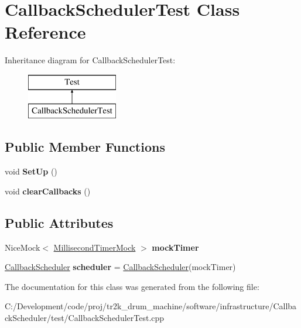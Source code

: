 \hypertarget{class_callback_scheduler_test}{}\section{Callback\+Scheduler\+Test Class Reference}
\label{class_callback_scheduler_test}
Inheritance diagram for Callback\+Scheduler\+Test\+:\begin{figure}[H]
\begin{center}
\leavevmode
\includegraphics[height=2.000000cm]{class_callback_scheduler_test}
\end{center}
\end{figure}
\subsection*{Public Member Functions}
\begin{DoxyCompactItemize}
\item 
\mbox{\label{class_callback_scheduler_test_adf4ab19daae87441f68536cdc15fce3b}} 
void {\bfseries Set\+Up} ()
\item 
\mbox{\label{class_callback_scheduler_test_a91d52d3665d6ed1d581668e0b6d19bb5}} 
void {\bfseries clear\+Callbacks} ()
\end{DoxyCompactItemize}
\subsection*{Public Attributes}
\begin{DoxyCompactItemize}
\item 
\mbox{\label{class_callback_scheduler_test_abb0d11a849fb891cbecc0723649ef9bc}} 
Nice\+Mock$<$ \mbox{\hyperlink{class_millisecond_timer_mock}{Millisecond\+Timer\+Mock}} $>$ {\bfseries mock\+Timer}
\item 
\mbox{\label{class_callback_scheduler_test_ab2aeb62e1c5cf507fcf59bf8f1021dfa}} 
\mbox{\hyperlink{class_callback_scheduler}{Callback\+Scheduler}} {\bfseries scheduler} = \mbox{\hyperlink{class_callback_scheduler}{Callback\+Scheduler}}(mock\+Timer)
\end{DoxyCompactItemize}


The documentation for this class was generated from the following file\+:\begin{DoxyCompactItemize}
\item 
C\+:/\+Development/code/proj/tr2k\+\_\+drum\+\_\+machine/software/infrastructure/\+Callback\+Scheduler/test/Callback\+Scheduler\+Test.\+cpp\end{DoxyCompactItemize}
